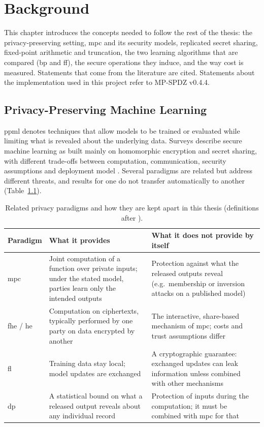 \chapter{Background}\label{chap:background}

\begin{sloppypar}
This chapter introduces the concepts needed to follow the rest of the thesis: the privacy-preserving setting, \ac{mpc} and its security models, replicated secret sharing, fixed-point arithmetic and truncation, the two learning algorithms that are compared (\ac{bp} and \ac{ff}), the secure operations they induce, and the way cost is measured. Statements that come from the literature are cited. Statements about the implementation used in this project refer to MP-SPDZ v0.4.4.
\end{sloppypar}

\section{Privacy-Preserving Machine Learning}\label{sec:bg-ppml}
\ac{ppml} denotes techniques that allow models to be trained or evaluated while limiting what is revealed about the underlying data. Surveys describe secure machine learning as built mainly on homomorphic encryption and secret sharing, with different trade-offs between computation, communication, security assumptions and deployment model \cite{zhou2024smpc}. Several paradigms are related but address different threats, and results for one do not transfer automatically to another (Table~\ref{tab:bg-paradigms}).

\begin{table}[ht]
\centering
\small
\begin{tabular}{@{}>{\raggedright\arraybackslash}p{2.6cm}>{\raggedright\arraybackslash}p{5.4cm}>{\raggedright\arraybackslash}p{6.2cm}@{}}
\toprule
Paradigm & What it provides & What it does not provide by itself \\
\midrule
\ac{mpc} & Joint computation of a function over private inputs; under the stated model, parties learn only the intended outputs & Protection against what the released outputs reveal (e.g.\ membership or inversion attacks on a published model) \\
\ac{fhe} / \ac{he} & Computation on ciphertexts, typically performed by one party on data encrypted by another & The interactive, share-based mechanism of \ac{mpc}; costs and trust assumptions differ \\
\ac{fl} & Training data stay local; model updates are exchanged & A cryptographic guarantee: exchanged updates can leak information unless combined with other mechanisms \\
\ac{dp} & A statistical bound on what a released output reveals about any individual record & Protection of inputs during the computation; it must be combined with \ac{mpc} for that \\
\bottomrule
\end{tabular}
\caption{Related privacy paradigms and how they are kept apart in this thesis (definitions after \cite{zhou2024smpc,das2025dpmpc}).}
\label{tab:bg-paradigms}
\end{table}


